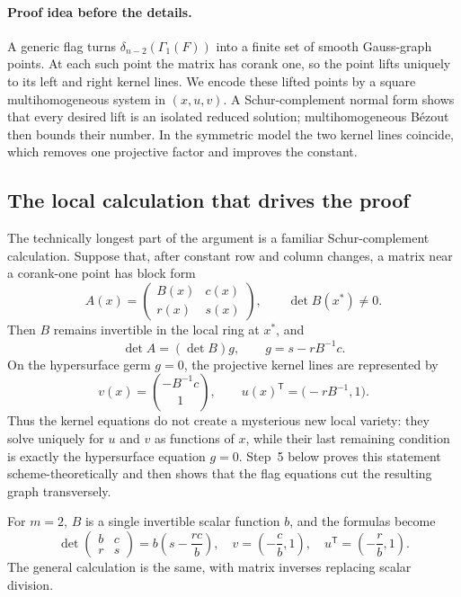 \documentclass[acmsmall,screen,nonacm]{acmart}
\theoremstyle{definition}
\theoremstyle{remark}
\newcommand{\pdeg}{\delta}
\newcommand{\Gone}{\Gamma_{\!1}}
\begin{document}
\paragraph{Proof idea before the details.}
A generic flag turns $\pdeg_{n-2}(\Gone(F))$ into a finite set of smooth Gauss-graph points.  At each such point the matrix has corank one, so the point lifts uniquely to its left and right kernel lines.  We encode these lifted points by a square multihomogeneous system in $(x,u,v)$.  A Schur-complement normal form shows that every desired lift is an isolated reduced solution; multihomogeneous B\'ezout then bounds their number.  In the symmetric model the two kernel lines coincide, which removes one projective factor and improves the constant.

\subsection{The local calculation that drives the proof}

The technically longest part of the argument is a familiar Schur-complement
calculation.  Suppose that, after constant row and column changes, a matrix
near a corank-one point has block form
\[
  \widehat A(x)=
  \begin{pmatrix}B(x)&c(x)\\ r(x)&s(x)\end{pmatrix},
  \qquad \det B(x^*)\ne0.
\]
Then $B$ remains invertible in the local ring at $x^*$, and
\[
  \det\widehat A=(\det B)g,
  \qquad g=s-rB^{-1}c.
\]
On the hypersurface germ $g=0$, the projective kernel lines are represented
by
\[
  v(x)=\binom{-B^{-1}c}{1},
  \qquad
  u(x)^{\mathsf T}=\big(-rB^{-1},1\big).
\]
Thus the kernel equations do not create a mysterious new local variety: they
solve uniquely for $u$ and $v$ as functions of $x$, while their last remaining
condition is exactly the hypersurface equation $g=0$.  Step~5 below proves
this statement scheme-theoretically and then shows that the flag equations
cut the resulting graph transversely.

For $m=2$, $B$ is a single invertible scalar function $b$, and the formulas
become
\[
  \det\begin{pmatrix}b&c\\r&s\end{pmatrix}=b\left(s-\frac{rc}{b}\right),
  \quad
  v=\left(-\frac cb,1\right),
  \quad
  u^{\mathsf T}=\left(-\frac rb,1\right).
\]
The general calculation is the same, with matrix inverses replacing scalar
division.
\end{document}
